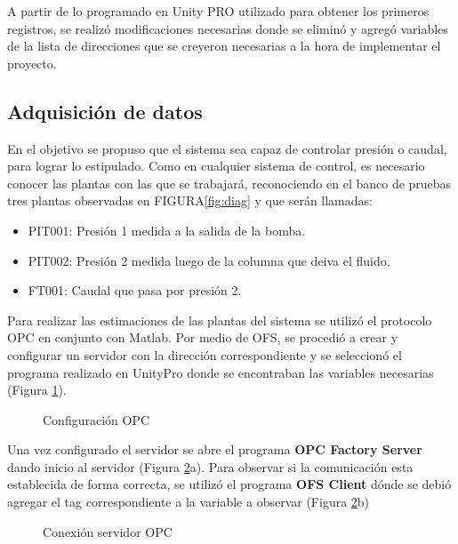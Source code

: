 
A partir de lo programado en Unity PRO utilizado para obtener los primeros registros, se realizó modificaciones necesarias donde se eliminó y agregó variables de la lista de direcciones que se creyeron necesarias a la hora de implementar el proyecto.\\

\subsection{Adquisición de datos}
En el objetivo se propuso que el sistema sea capaz de controlar presión o caudal, para lograr lo estipulado. Como en cualquier sistema de control, es necesario conocer las plantas con las que se trabajará, reconociendo en el banco de pruebas tres plantas observadas en  FIGURA\ref{fig:diag} y que serán llamadas:
\begin{itemize}
	\item PIT001: Presión 1 medida a la salida de la bomba.
	\item PIT002: Presión 2 medida luego de la columna que deiva el fluido.
	\item FT001: Caudal que pasa por presión 2.
\end{itemize}
Para realizar las estimaciones de las plantas del sistema se utilizó el protocolo OPC en conjunto con Matlab. Por medio de OFS, se procedió a crear y configurar un servidor con la dirección correspondiente y se seleccionó el programa realizado en UnityPro donde se encontraban las variables necesarias (Figura \ref{fig:opc1}).

\begin{figure}[htbp]
	\centering
	\caption{Configuración OPC} \label{fig:opc1}
\end{figure}


Una vez configurado el servidor se abre el programa \textbf{OPC Factory Server} dando inicio al servidor (Figura \ref{fig:opc2}a). Para observar si la comunicación esta establecida de forma correcta, se utilizó el programa \textbf{OFS Client} dónde se debió agregar el tag correspondiente a la variable a observar (Figura \ref{fig:opc2}b)

\begin{figure}[htbp]
	\centering
	\caption{Conexión servidor OPC} \label{fig:opc2}
\end{figure}

